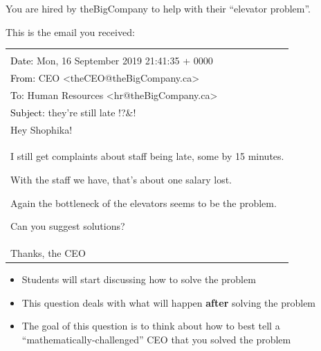 You are hired by theBigCompany to help with their ``elevator problem''.

This is the email you received:

\begin{center}
	\color{blue}
	\begin{tabular}{l}
	\begin{minipage}{.75\textwidth}
	-------- Forwarded Message -------- \\[10pt]
	\textcolor{black}{Date: } Mon, 16 September 2019 21:41:35 + 0000  \\
	\textcolor{black}{From: } CEO <theCEO@theBigCompany.ca> \\
	\textcolor{black}{To: } Human Resources <hr@theBigCompany.ca> \\
	\textcolor{black}{Subject: } they're still late !?\@\&! \\
	
	Hey Shophika! \\
	
	I still get complaints about staff being late, some by 15 minutes.
	
	With the staff we have, that's about one salary lost.
	
	Again the bottleneck of the elevators seems to be the problem.
	
	Can you suggest solutions? \\
	
	Thanks, the CEO
	\end{minipage}
	\end{tabular}
\end{center}


\vspace{5mm}

\begin{annotation}
	\begin{notes}
		
		\begin{itemize}
			\item Students will start discussing how to solve the problem
			\item This question deals with what will happen \textbf{after} solving the problem
			\item The goal of this question is to think about how to best tell a ``mathematically-challenged'' CEO that you solved the problem
		\end{itemize}
	\end{notes}
\end{annotation}

